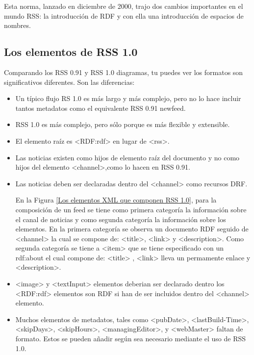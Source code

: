 Esta norma, lanzado en diciembre de 2000, trajo dos cambios importantes en el 
mundo RSS: la introducci\'{o}n de RDF y con ella una introducci\'{o}n de espacios
de nombres.\cite{hammersley2005developing}
 
\subsection{Los elementos de RSS 1.0}

Comparando los RSS 0.91 y RSS 1.0 diagramas, tu puedes ver los formatos son significativos
diferentes. Son las diferencias:

\begin{itemize}

\item Un t\'{i}pico flujo RS 1.0 es m\'{a}s largo y m\'{a}s complejo, pero no lo hace incluir
tantos metadatos como el equivalente RSS 0.91 newfeed.

\item RSS 1.0 es m\'{a}s complejo, pero s\'{o}lo porque es m\'{a}s flexible y extensible.

\item El elemento ra\'{i}z es <RDF:rdf>  en lugar de <rss>.

\item Las noticias existen como hijos de elemento ra\'{i}z del documento y no como 
hijos del elemento <channel>,como lo hacen en RSS 0.91.

\item Las noticias deben ser declaradas dentro del <channel> como recursos DRF. \par

En la Figura \ref{Los elementos XML que componen RSS 1.0}, para la composici\'{o}n
de un feed se tiene como primera categor\'{i}a la informaci\'{o}n sobre el canal 
de noticias y como segunda categor\'{i}a la informaci\'{o}n sobre los elementos.
En la primera  categor\'{i}a se observa un documento RDF seguido de <channel> la
cual se compone de: <title>, <link> y <description>. Como segunda categor\'{i}a 
se tiene a <item> que se tiene especificado con un rdf:about el cual compone de:
<title> , <link> lleva un permamente enlace y <description>. 

\begin{minipage}{1.0\linewidth}
	\centering
	\label{Los elementos XML que componen RSS 1.0}
\end{minipage}

\item <image> y <textInput> elementos deberian ser declarado dentro los <RDF:rdf>
elementos son RDF si han de ser incluidos dentro del <channel> elemento.

\item Muchos elementos de metadatos, tales como  <pubDate>, <lastBuild-Time>, 
<skipDays>, <skipHours>, <managingEditor>, y <webMaster> faltan de formato.
Estos se pueden a\~{n}adir seg\'{u}n sea necesario mediante el uso de RSS 1.0.
\cite{johnson2006rss}

\end{itemize}

